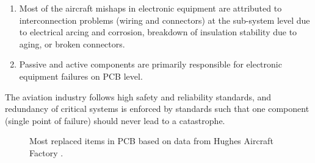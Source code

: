 \begin{enumerate}[topsep=8pt,itemsep=4pt,partopsep=4pt, parsep=4pt]
    \item Most of the aircraft mishaps in electronic equipment are attributed to
    interconnection problems (wiring and connectors) at the sub-system level due
    to electrical arcing and corrosion, breakdown of insulation stability due to
    aging, or broken connectors.
    \item Passive and active components are primarily responsible for electronic
    equipment failures on \ac{PCB} level.
\end{enumerate}

The aviation industry follows high safety and reliability standards, and
redundancy of critical systems is enforced by standards such that one component
(single point of failure) should never lead to a catastrophe.

\begin{figure}[h]
    \centering
    \settowidth{\TL}{\footnotesize Integrated}

    \caption[Most replaced items in avionic repairs]{Most replaced items in
    \ac{PCB} based on data from Hughes Aircraft Factory
    \autocite{wong1987culprits}.}
    \label{fig:aircraft-component-errors}
\end{figure}

